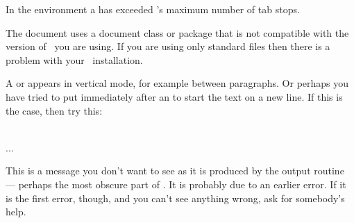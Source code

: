 \begin{plainlist}
    In the  environment a \cmd{\=} has exceeded \ltx's maximum
number of tab stops.


\item[]

    The document uses a document class or package that is not compatible
with the  version of \ltx\ you are using. If you are using only standard
files then there is a problem with your \ltx\ installation.


\item[]

    A \cmd{\newline} or \cmd{\\} appears in vertical mode, for example 
between paragraphs. Or perhaps you have tried to put \cmd{\\} immediately 
after an \cmd{\item} to start the text on a new line. If this is the case, 
then try this:
\begin{lcode}
\item \mbox{} \\
...
\end{lcode}

\item[] 
 
    This is a message you don't want to see as it is produced by the
output routine --- perhaps the most obscure part of \ltx. It is probably
due to an earlier error. If it is the first error, though, and you can't 
see anything wrong, ask for somebody's help.




\end{plainlist}
